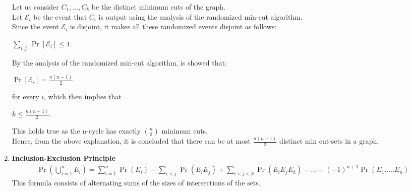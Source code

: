 \documentclass{article}
\begin{document}
\begin{enumerate}
    \textnormal{Let us consider $C_1, ...,C_k$ be the distinct minimum cuts of the graph.}\\
    \textnormal{Let $\mathcal{E}_i$ be the event that $C_i$ is output using the analysis of the randomized min-cut algorithm.}\\
    \textnormal{Since the event $\mathcal{E}_i$ is disjoint, it makes all these randomized events disjoint as follows:}\\
    \begin{center}
        $\sum_{i,j} \ \Pr[\mathcal{E}_i] \leq 1.$
    \end{center}
    \textnormal{By the analysis of the randomized min-cut algorithm, is showed that:}\\
    \begin{center}
        $\Pr[\mathcal{E}_i] = \frac{n(n-1)}{2}$
    \end{center}
    \textnormal{for every $i$, which then implies that}\\
    \begin{center}
        $k \leq \frac{n(n-1)}{2}.$
    \end{center}
    \textnormal{This holds true as the n-cycle has exactly $\binom{n}{2}$ minimum cuts.}\\
    \textnormal{Hence, from the above explanation, it is concluded that there can be at most $\frac{n(n-1)}{2}$ distinct min cut-sets in a graph.}\\
\newpage
\item \textbf{Inclusion-Exclusion Principle}
  \begin{align*}
    \Pr\left(\bigcup_{i=1}^{n} E_i\right) = \sum_{i=1}^{n} \Pr(E_i) - \sum_{i<j}^{} \Pr(E_i E_j) + \sum_{i<j<k}^{} \Pr(E_i E_j E_k) - ... + (-1)^{n+1}\Pr(E_1..... E_n)
  \end{align*}
  \textnormal{This formula consists of alternating sums of the sizes of intersections of the sets.}
  
\end{enumerate}
\end{document}
